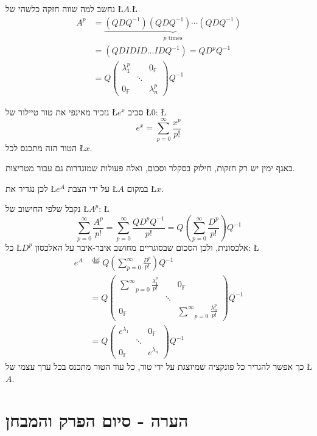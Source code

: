 \documentclass[english,hebrew]{article}
\begin{document}
נחשב למה שווה חזקה כלשהי של \L{$A$}.\L{%
\begin{align*}
A^{p} & =\underset{p\text{ times}}{\underbrace{(QDQ^{-1})(QDQ^{-1})\cdots(QDQ^{-1})}}\\
 & =(QDIDID\dots IDQ^{-1})=QD^{p}Q^{-1}\\
 & =Q\begin{pmatrix}\lambda_{1}^{p} &  & 0_{\mathbb{F}}\\
 & \ddots\\
0_{\mathbb{F}} &  & \lambda_{n}^{p}
\end{pmatrix}Q^{-1}
\end{align*}
}%

נזכיר מאינפי {\endL} את טור טיילור של \L{$e^{x}$} סביב \L{$0$}:
\L{%
\[
e^{x}=\sum_{p=0}^{\infty}\frac{x^{p}}{p!}
\]
}%
הטור הזה מתכנס לכל \L{$x$}.

באגף ימין יש רק חזקות, חילוק בסקלר וסכום, ואלה פעולות שמוגדרות גם
עבור מטריצות.

לכן נגדיר את \L{$e^{A}$} על ידי הצבת \L{$A$} במקום \L{$x$}. 

נקבל שלפי החישוב של \L{$A^{p}$}: \L{%
\[
\sum_{p=0}^{\infty}\frac{A^{p}}{p!}=\sum_{p=0}^{\infty}\frac{QD^{p}Q^{-1}}{p!}=Q\left(\sum_{p=0}^{\infty}\frac{D^{p}}{p!}\right)Q^{-1}
\]
}%
כל \L{$D^{p}$} אלכסונית, ולכן הסכום שבסוגריים מחושב איבר-איבר על
האלכסון: \L{%
\begin{align*}
e^{A} & \overset{\text{def}}{=}Q\left(\sum_{p=0}^{\infty}\frac{D^{p}}{p!}\right)Q^{-1}\\
 & =Q\begin{pmatrix}\underset{p=0}{\overset{\infty}{\sum}}\frac{\lambda_{1}^{p}}{p!} &  & 0_{\mathbb{F}}\\
 & \ddots\\
0_{\mathbb{F}} &  & \underset{p=0}{\overset{\infty}{\sum}}\frac{\lambda_{n}^{p}}{p!}
\end{pmatrix}Q^{-1}\\
 & =Q\begin{pmatrix}e^{\lambda_{1}} &  & 0_{\mathbb{F}}\\
 & \ddots\\
0_{\mathbb{F}} &  & e^{\lambda_{n}}
\end{pmatrix}Q^{-1}
\end{align*}
}%
כך אפשר להגדיר כל פונקציה שמיוצגת על ידי טור, כל עוד הטור מתכנס בכל
ערך עצמי של \L{$A$}.

\section{הערה - סיום הפרק והמבחן}
\end{document}
